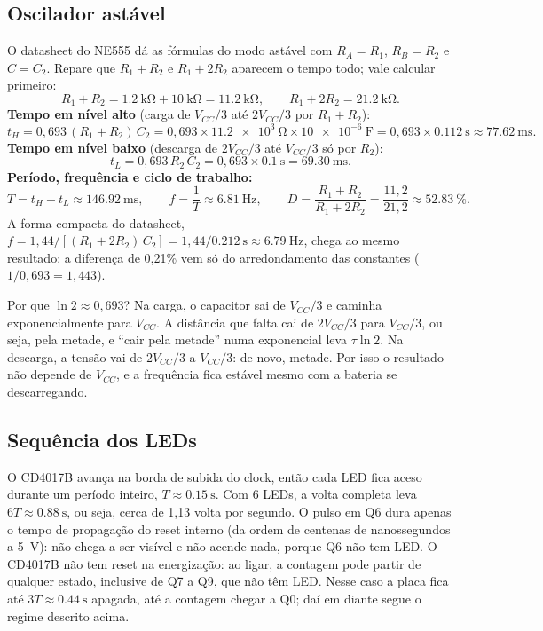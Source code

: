 \documentclass[11pt,a4paper]{article}
\begin{document}
\subsection{Oscilador astável}
O datasheet do NE555 dá as fórmulas do modo astável com $R_A = R_1$, $R_B = R_2$ e
$C = C_2$. Repare que $R_1 + R_2$ e $R_1 + 2R_2$ aparecem o tempo todo; vale calcular
primeiro:
\[
R_1 + R_2 = \SI{1,2}{\kilo\ohm} + \SI{10}{\kilo\ohm} = \SI{11,2}{\kilo\ohm},
\qquad
R_1 + 2R_2 = \SI{21,2}{\kilo\ohm}.
\]
\textbf{Tempo em nível alto} (carga de $V_{CC}/3$ até $2V_{CC}/3$ por $R_1 + R_2$):
\[
t_H = 0{,}693\,(R_1+R_2)\,C_2 = 0{,}693 \times \SI{11,2e3}{\ohm} \times \SI{10e-6}{\farad}
= 0{,}693 \times \SI{0,112}{\second} \approx \SI{77,62}{\milli\second}.
\]
\textbf{Tempo em nível baixo} (descarga de $2V_{CC}/3$ até $V_{CC}/3$ só por $R_2$):
\[
t_L = 0{,}693\,R_2\,C_2 = 0{,}693 \times \SI{0,1}{\second} = \SI{69,30}{\milli\second}.
\]
\textbf{Período, frequência e ciclo de trabalho:}
\[
T = t_H + t_L \approx \SI{146,92}{\milli\second}, \qquad
f = \frac{1}{T} \approx \SI{6,81}{\hertz}, \qquad
D = \frac{R_1+R_2}{R_1+2R_2} = \frac{11{,}2}{21{,}2} \approx \SI{52,83}{\percent}.
\]
A forma compacta do datasheet, $f = 1{,}44/[(R_1+2R_2)\,C_2] = 1{,}44/\SI{0,212}{\second}
\approx \SI{6,79}{\hertz}$, chega ao mesmo resultado: a diferença de 0,21\% vem só do
arredondamento das constantes ($1/0{,}693 = 1{,}443$).

\begin{dicaprof}
Por que $\ln 2 \approx 0{,}693$? Na carga, o capacitor sai de $V_{CC}/3$ e caminha
exponencialmente para $V_{CC}$. A distância que falta cai de $2V_{CC}/3$ para $V_{CC}/3$,
ou seja, pela metade, e “cair pela metade” numa exponencial leva $\tau\ln 2$. Na descarga, a
tensão vai de $2V_{CC}/3$ a $V_{CC}/3$: de novo, metade. Por isso o resultado não depende
de $V_{CC}$, e a frequência fica estável mesmo com a bateria se descarregando.
\end{dicaprof}

\subsection{Sequência dos LEDs}
O CD4017B avança na borda de subida do clock, então cada LED fica aceso durante um
período inteiro, $T \approx \SI{0,15}{\second}$. Com 6 LEDs, a volta completa leva
$6T \approx \SI{0,88}{\second}$, ou seja, cerca de 1,13 volta por segundo. O pulso em Q6
dura apenas o tempo de propagação do reset interno (da ordem de centenas de
nanossegundos a \SI{5}{\volt}): não chega a ser visível e não acende nada, porque Q6 não
tem LED. O CD4017B não tem reset na energização: ao ligar, a contagem pode partir de
qualquer estado, inclusive de Q7 a Q9, que não têm LED. Nesse caso a placa fica até
$3T \approx \SI{0,44}{\second}$ apagada, até a contagem chegar a Q0; daí em diante segue
o regime descrito acima.
\end{document}
